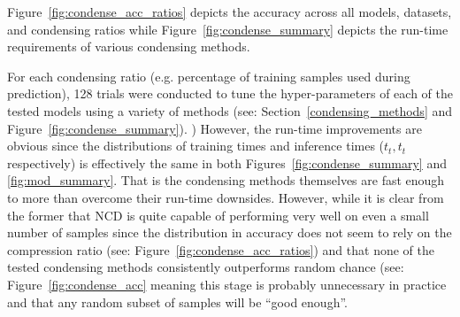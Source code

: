 \documentclass[conference]{IEEEtran}
\begin{document}
Figure~\ref{fig:condense_acc_ratios} depicts the accuracy across all models, datasets, and condensing ratios while Figure~\ref{fig:condense_summary} depicts the run-time requirements of various condensing methods. 

For each condensing ratio (e.g. percentage of training samples used during prediction), 128 trials were conducted to tune the hyper-parameters of each of the tested models using a variety of methods (see: Section~\ref{condensing_methods} and Figure~\ref{fig:condense_summary}). 
) However, the run-time improvements are obvious since the distributions of training times and inference times ($t_t, t_t$ respectively) is effectively the same in both Figures~\ref{fig:condense_summary} and \ref{fig:mod_summary}. That is the condensing methods themselves are fast enough to more than overcome their run-time downsides. However, while it is clear from the former that NCD is quite capable of performing very well on even a small number of samples since the distribution in accuracy does not seem to rely on the compression ratio (see: Figure~\ref{fig:condense_acc_ratios}) and that none of the tested condensing methods consistently outperforms random chance (see: Figure~\ref{fig:condense_acc} meaning this stage is probably unnecessary in practice and that any random subset of samples will be ``good enough''. 

\end{document}
